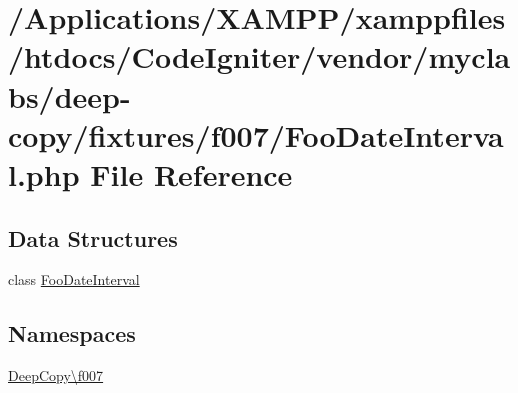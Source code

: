\hypertarget{_foo_date_interval_8php}{}\section{/\+Applications/\+X\+A\+M\+P\+P/xamppfiles/htdocs/\+Code\+Igniter/vendor/myclabs/deep-\/copy/fixtures/f007/\+Foo\+Date\+Interval.php File Reference}
\label{_foo_date_interval_8php}
\subsection*{Data Structures}
\begin{DoxyCompactItemize}
\item 
class \mbox{\hyperlink{class_deep_copy_1_1f007_1_1_foo_date_interval}{Foo\+Date\+Interval}}
\end{DoxyCompactItemize}
\subsection*{Namespaces}
\begin{DoxyCompactItemize}
\item 
 \mbox{\hyperlink{namespace_deep_copy_1_1f007}{Deep\+Copy\textbackslash{}f007}}
\end{DoxyCompactItemize}
